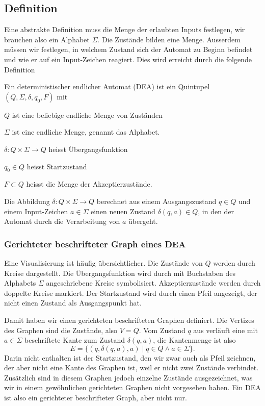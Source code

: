 \subsection{Definition\label{regulaer:definition-dea}}
%
%
%
Eine abstrakte Definition muss die Menge der erlaubten Inputs
festlegen, wir brauchen also ein Alphabet $\Sigma$.
Die Zustände bilden eine Menge.
Ausserdem müssen wir festlegen, in welchem Zustand
sich der Automat zu Beginn befindet und wie er auf ein Input-Zeichen
reagiert.
Dies wird erreicht durch die folgende Definition
\begin{definition}
Ein deterministischer endlicher Automat (DEA) ist ein Quintupel
$(Q,\Sigma,\delta, q_0,F)$ mit
\begin{compactenum}
\item $Q$ ist eine beliebige endliche Menge von Zuständen
\item $\Sigma$ ist eine endliche Menge, genannt das Alphabet.
%
\item $\delta\colon Q\times\Sigma\to Q$ heisst Übergangsfunktion
%
\item $q_0\in Q$ heisst Startzustand
%
\item $F\subset Q$ heisst die Menge der Akzeptierzustände.
\end{compactenum}
\end{definition}
Die Abbildung $\delta\colon Q\times \Sigma\to Q$ berechnet
aus einem Ausgangszustand $q\in Q$ und einem Input-Zeichen $a\in\Sigma$
einen neuen Zustand $\delta(q,a)\in Q$, in den der Automat durch
die Verarbeitung von $a$ übergeht.

\subsubsection{Gerichteter beschrifteter Graph eines DEA}
%
Eine Visualisierung ist häufig übersichtlicher.
Die Zustände von $Q$ werden durch Kreise dargestellt.
Die Übergangsfunktion wird durch mit Buchstaben des Alphabets $\Sigma$
angeschriebene Kreise symbolisiert.
Akzeptierzustände werden durch doppelte Kreise markiert.
Der Startzustand wird durch einen
Pfeil angezeigt, der nicht einen Zustand als Ausgangspunkt hat.

Damit haben wir einen gerichteten beschrifteten Graphen definiert.
Die Vertizes des Graphen sind die Zustände, also $V=Q$.
Vom Zustand $q$ aus verläuft eine mit $a\in\Sigma$ beschriftete
Kante zum Zustand $\delta(q,a)$, 
die Kantenmenge
ist also
\[
E=\{(q,\delta(q,a),a)\;|\; q\in Q\wedge a\in\Sigma\}.
\]
Darin nicht enthalten ist der Startzustand, den wir zwar auch als
Pfeil zeichnen, der aber nicht eine Kante des Graphen ist, weil
er nicht zwei Zustände verbindet.
Zusätzlich sind in diesem Graphen jedoch einzelne Zustände ausgezeichnet,
was wir in einem gewöhnlichen gerichteten Graphen nicht vorgesehen
haben.
Ein DEA ist also ein gerichteter beschrifteter Graph, aber nicht
nur.

